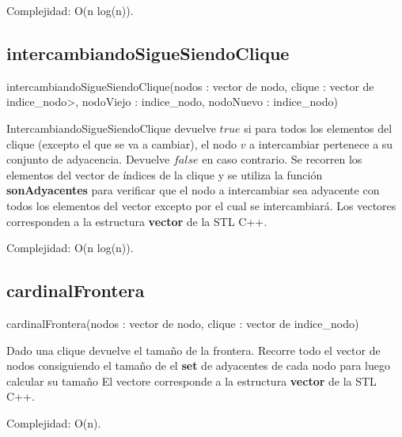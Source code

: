 Complejidad: O(n log(n)).

\subsection{intercambiandoSigueSiendoClique}
intercambiandoSigueSiendoClique(nodos : vector de nodo, clique : vector de indice\_nodo>, nodoViejo : indice\_nodo, nodoNuevo : indice\_nodo)

IntercambiandoSigueSiendoClique devuelve $true$ si para todos los elementos del clique (excepto el que se va a cambiar), el nodo $v$ a intercambiar pertenece a su conjunto de adyacencia. Devuelve $false$ en caso contrario.
Se recorren los elementos del vector de índices de la clique y se utiliza la función \textbf{sonAdyacentes} para verificar que el nodo a intercambiar sea adyacente con todos los elementos del vector excepto por el cual se intercambiará.
Los vectores corresponden a la estructura \textbf{vector} de la STL C++.

Complejidad: O(n log(n)).

\subsection{cardinalFrontera}
cardinalFrontera(nodos : vector de nodo, clique : vector de indice\_nodo)

Dado una clique devuelve el tamaño de la frontera.
Recorre todo el vector de nodos consiguiendo el tamaño de el \textbf{set} de adyacentes de cada nodo para luego calcular su tamaño
El vectore corresponde a la estructura \textbf{vector} de la STL C++.

Complejidad: O(n).
